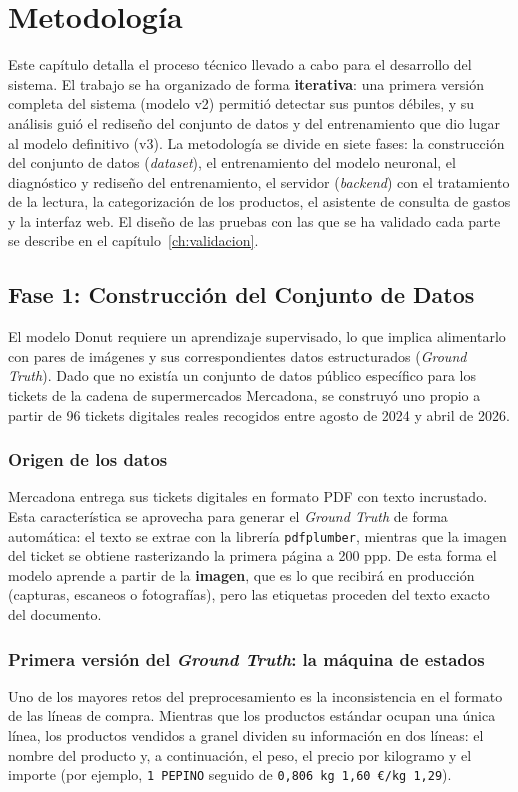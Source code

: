 \chapter{Metodología}
\label{ch:metodologia}

Este capítulo detalla el proceso técnico llevado a cabo para el desarrollo del sistema. El trabajo se ha organizado de forma \textbf{iterativa}: una primera versión completa del sistema (modelo v2) permitió detectar sus puntos débiles, y su análisis guió el rediseño del conjunto de datos y del entrenamiento que dio lugar al modelo definitivo (v3). La metodología se divide en siete fases: la construcción del conjunto de datos (\textit{dataset}), el entrenamiento del modelo neuronal, el diagnóstico y rediseño del entrenamiento, el servidor (\textit{backend}) con el tratamiento de la lectura, la categorización de los productos, el asistente de consulta de gastos y la interfaz web. El diseño de las pruebas con las que se ha validado cada parte se describe en el capítulo~\ref{ch:validacion}.

\section{Fase 1: Construcción del Conjunto de Datos}
\label{s:dataset}
El modelo Donut requiere un aprendizaje supervisado, lo que implica alimentarlo con pares de imágenes y sus correspondientes datos estructurados (\textit{Ground Truth}). Dado que no existía un conjunto de datos público específico para los tickets de la cadena de supermercados Mercadona, se construyó uno propio a partir de 96 tickets digitales reales recogidos entre agosto de 2024 y abril de 2026.

\subsection{Origen de los datos}
Mercadona entrega sus tickets digitales en formato PDF con texto incrustado. Esta característica se aprovecha para generar el \textit{Ground Truth} de forma automática: el texto se extrae con la librería \texttt{pdfplumber}, mientras que la imagen del ticket se obtiene rasterizando la primera página a 200 ppp. De esta forma el modelo aprende a partir de la \textbf{imagen}, que es lo que recibirá en producción (capturas, escaneos o fotografías), pero las etiquetas proceden del texto exacto del documento.

\subsection{Primera versión del \textit{Ground Truth}: la máquina de estados}
Uno de los mayores retos del preprocesamiento es la inconsistencia en el formato de las líneas de compra. Mientras que los productos estándar ocupan una única línea, los productos vendidos a granel dividen su información en dos líneas: el nombre del producto y, a continuación, el peso, el precio por kilogramo y el importe (por ejemplo, \texttt{1 PEPINO} seguido de \texttt{0,806 kg 1,60 €/kg 1,29}).

